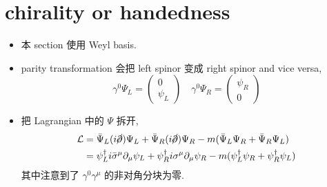 \section{chirality or handedness}
\begin{itemize}
	\item 本 section 使用 Weyl basis.
	
	\item parity transformation 会把 left spinor 变成 right spinor and vice versa,
	\begin{equation}
		\gamma^0 \Psi_L = \begin{pmatrix}
			0 \\
			\psi_L
		\end{pmatrix} \quad \gamma^0 \Psi_R = \begin{pmatrix}
			\psi_R \\
			0
		\end{pmatrix}
	\end{equation}
	
	\item 把 Lagrangian 中的 $\Psi$ 拆开,
	\begin{align}
		\mathcal{L} &= \bar{\Psi}_L (i \cancel{\partial}) \Psi_L + \bar{\Psi}_R (i \cancel{\partial}) \Psi_R - m (\bar{\Psi}_L \Psi_R + \bar{\Psi}_R \Psi_L) \notag \\
		&= \psi_L^\dag i \bar{\sigma}^\mu \partial_\mu \psi_L + \psi_R^\dag i \sigma^\mu \partial_\mu \psi_R - m (\psi_L^\dag \psi_R + \psi_R^\dag \psi_L)
	\end{align}
	其中注意到了 $\gamma^0 \gamma^\mu$ 的非对角分块为零.
\end{itemize}

